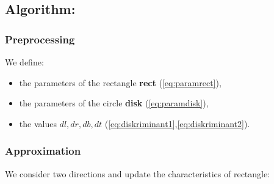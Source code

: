 \documentclass{report}
\begin{document}
\subsection*{Algorithm:}

\subsubsection*{Preprocessing}

 We define:
 
 \begin{itemize}
 	
 	\item the parameters of the rectangle {\bfseries rect} (\ref{eq:paramrect}),
 	
 	\item the parameters of the circle {\bfseries disk} (\ref{eq:paramdisk}),
 	
 	\item the values $dl, dr, db, dt$ (\ref{eq:diskriminant1},\ref{eq:diskriminant2}).
 		
 \end{itemize}

\subsubsection*{Approximation}

    We consider two directions and update the characteristics of rectangle:
	
\end{document}
